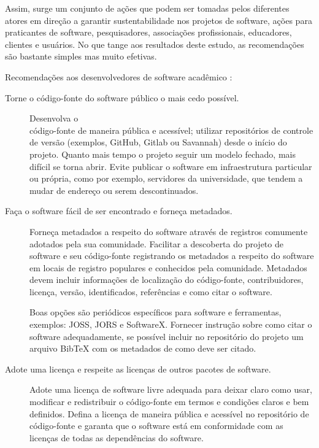 Assim, surge um conjunto de ações que podem ser tomadas pelos diferentes atores
em direção a garantir sustentabilidade nos projetos de software, ações para
praticantes de software, pesquisadores, associações profissionais, educadores,
clientes e usuários. No que tange aos resultados deste estudo, as recomendações
são bastante simples mas muito efetivas.

Recomendações aos desenvolvedores de software acadêmico \cite{jimenez_four_2017}:

\begin{description}
  \item [Torne o código-fonte do software público o mais cedo possível.]

    Desenvolva o \\ código-fonte de maneira pública e acessível; utilizar
    repositórios de controle de versão (exemplos, GitHub, Gitlab ou Savannah)
    desde o início do projeto. Quanto mais tempo o projeto seguir um modelo
    fechado, mais difícil se torna abrir. Evite publicar o software em
    infraestrutura particular ou própria, como por exemplo, servidores da
    universidade, que tendem a mudar de endereço ou serem descontinuados.

  \item [Faça o software fácil de ser encontrado e forneça metadados.]

    Forneça metadados a respeito do software através de registros comumente
    adotados pela sua comunidade. Facilitar a descoberta do projeto de software
    e seu código-fonte registrando os metadados a respeito do software em
    locais de registro populares e conhecidos pela comunidade. Metadados devem
    incluir informações de localização do código-fonte, contribuidores,
    licença, versão, identificados, referências e como citar o software.

    Boas opções são periódicos específicos para software e ferramentas, exemplos:
    JOSS, JORS e SoftwareX. Fornecer instrução sobre como citar o software
    adequadamente, se possível incluir no repositório do projeto um arquivo
    BibTeX com os metadados de como deve ser citado.

  \item [Adote uma licença e respeite as licenças de outros pacotes de software.]

    Adote uma licença de software livre adequada para deixar claro como usar,
    modificar e redistribuir o código-fonte em termos e condições claros e bem
    definidos. Defina a licença de maneira pública e acessível no repositório
    de código-fonte e garanta que o software está em conformidade com as
    licenças de todas as dependências do software.


\end{description}

